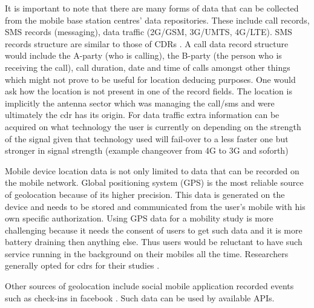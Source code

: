 \documentclass[12pt, a4paper]{report}
\theoremstyle{definition}
\theoremstyle{definition}%
\theoremstyle{definition}%
\theoremstyle{definition}%
\theoremstyle{definition}%
\theoremstyle{definition}%
\begin{document}
It is important to note that there are many forms of data that can be collected from the mobile base station centres' data repositories. These include call records, SMS records (messaging), data traffic (2G/GSM, 3G/UMTS, 4G/LTE). SMS records structure are similar to those of CDRs \cite{Calabrese2013}. A call data record structure would include the A-party (who is calling), the B-party (the person who is receiving the call), call duration, date and time of calls amongst other things which might not prove to be useful for location deducing purposes. One would ask how the location is not present in one of the record fields. The location is implicitly the antenna sector which was managing the call/sms and were ultimately the cdr has its origin. For data traffic extra information can be acquired on what technology the user is currently on depending on the strength of the signal given that technology used will fail-over to a less faster one but stronger in signal strength (example changeover from 4G to 3G and soforth)

Mobile device location data is not only limited to data that can be recorded on the mobile network. Global positioning system (GPS) is the most reliable source of geolocation because of its higher precision. This data is generated on the device and needs to be stored and communicated from the user's mobile with his own specific authorization. Using GPS data for a mobility study is more challenging because it needs the consent of users to get such data and it is more battery draining then anything else. Thus users would be reluctant to have such service running in the background on their mobiles all the time. Researchers generally opted for cdrs for their studies \cite{Hoteit2016}.

Other sources of geolocation include social mobile application recorded events such as check-ins in facebook \cite{Hoteit2014}. Such data can be used by available APIs.
\end{document}

